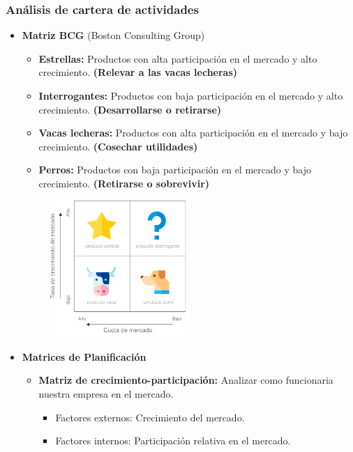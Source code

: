 \documentclass{templateNote}
\begin{document}
\subsubsection{Análisis de cartera de actividades}
    \begin{itemize}
        \item \textbf{Matriz BCG} (Boston Consulting Group)
        \begin{itemize}
            \item \textbf{Estrellas:} Productos con alta participación en el mercado y alto crecimiento. \textbf{(Relevar a las vacas lecheras)}
            \item \textbf{Interrogantes:} Productos con baja participación en el mercado y alto crecimiento. \textbf{(Desarrollarse o retirarse)}
            \item \textbf{Vacas lecheras:} Productos con alta participación en el mercado y bajo crecimiento. \textbf{(Cosechar utilidades)}
            \item \textbf{Perros:} Productos con baja participación en el mercado y bajo crecimiento. \textbf{(Retirarse o sobrevivir)}
        \end{itemize}
        \begin{figure}[H]
            \centering
            \includegraphics[width=0.5\textwidth]{img/matriz_bcg-768x803.png}
        \end{figure}
        \item \textbf{Matrices de Planificación}
        \begin{itemize}
            \item \textbf{Matriz de crecimiento-participación:} Analizar como funcionaria nuestra empresa en el mercado.
            \begin{itemize}
                \item Factores externos: Crecimiento del mercado.
                \item Factores internos: Participación relativa en el mercado.

\end{itemize}
\end{itemize}
\end{itemize}
\end{document}
